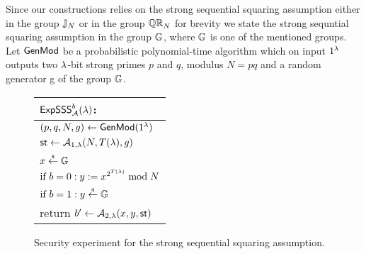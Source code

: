 Since our constructions relies on the strong sequential squaring assumption either in the group $\mathbb{J}_N$ \cite{C:MalThy19} or in the group $\mathbb{QR}_N$ \cite{TCC:KatLosXu20} for brevity we state the strong sequntial squaring assumption in the group $\mathbb{G}$, where $\mathbb{G}$ is one of the mentioned groups. Let $\mathsf{GenMod}$ be a probabilistic polynomial-time algorithm which on input $1{^{\lambda}}$ outputs two $\lambda$-bit strong primes $p$ and $q$, modulus $N= pq$ and a random generator g of the group $\mathbb{G}$.






\begin{figure}[h]
\begin{center}
\begin{tabular}{l}
$\mathsf{ExpSSS}_{\mathcal{A}}^{b}(\lambda)$: \\
\hline
$(p, q, N,g) \leftarrow \mathsf{GenMod}(1{^{\lambda}})$ \\
$\mathsf{st} \leftarrow \mathcal{A}_{1, \lambda}(N, T(\lambda),g)$\\
$x \stackrel{{\scriptscriptstyle\$}}{\leftarrow} \mathbb{G}$ \\
$\text{if } b = 0: y:=x^{2^{T(\lambda)}} \bmod N$\\
$\text{if } b = 1: y \stackrel{{\scriptscriptstyle\$}}{\leftarrow} \mathbb{G}$\\
return	$b' \leftarrow \mathcal{A}_{2,\lambda}(x, y, \mathsf{st})$
\end{tabular}
\end{center}
\caption{\label{fig:sss}Security experiment for the strong sequential squaring assumption.}
\end{figure}


